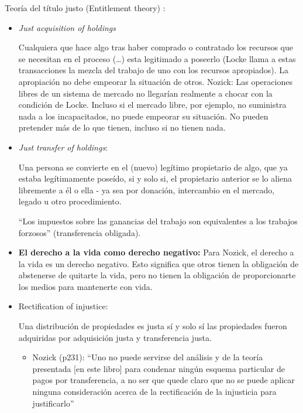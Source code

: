 \documentclass[
  letterpaper,
  DIV=11,
  numbers=noendperiod]{scrreprt}
\providecommand{\tightlist}{%
  \setlength{\itemsep}{0pt}\setlength{\parskip}{0pt}}\usepackage{longtable,booktabs,array}
\begin{document}
\begin{itemize}
  Teoría del título justo (Entitlement theory) :

  \begin{itemize}
  \item
    \emph{Just acquisition of holdings}

    Cualquiera que hace algo tras haber comprado o contratado los
    recursos que se necesitan en el proceso (\ldots) esta legitimado a
    poseerlo (Locke llama a estas transacciones la mezcla del trabajo de
    uno con los recursos apropiados). La apropiación no debe empeorar la
    situación de otros. Nozick: Las operaciones libres de un sistema de
    mercado no llegarían realmente a chocar con la condición de Locke.
    Incluso si el mercado libre, por ejemplo, no suministra nada a los
    incapacitados, no puede empeorar su situación. No pueden pretender
    más de lo que tienen, incluso si no tienen nada.
  \item
    \emph{Just transfer of holdings}:

    Una persona se convierte en el (nuevo) legítimo propietario de algo,
    que ya estaba legítimamente poseído, si y solo si, el propietario
    anterior se lo aliena libremente a él o ella - ya sea por donación,
    intercambio en el mercado, legado u otro procedimiento.

    ``Los impuestos sobre las ganancias del trabajo son equivalentes a
    los trabajos forzosos'' (transferencia obligada).
  \item
    \textbf{El derecho a la vida como derecho negativo:} Para Nozick, el
    derecho a la vida es un derecho negativo. Esto significa que otros
    tienen la obligación de abstenerse de quitarte la vida, pero no
    tienen la obligación de proporcionarte los medios para mantenerte
    con vida.
  \item
    Rectification of injustice:

    Una distribución de propiedades es justa sí y solo sí las
    propiedades fueron adquiridas por adquisición justa y transferencia
    justa.

    \begin{itemize}
    \tightlist
    \item
      Nozick (p231): ``Uno no puede servirse del análisis y de la teoría
      presentada {[}en este libro{]} para condenar ningún esquema
      particular de pagos por transferencia, a no ser que quede claro
      que no se puede aplicar ninguna consideración acerca de la
      rectificación de la injusticia para justificarlo''
    \end{itemize}
  \end{itemize}


\end{itemize}
\end{document}
